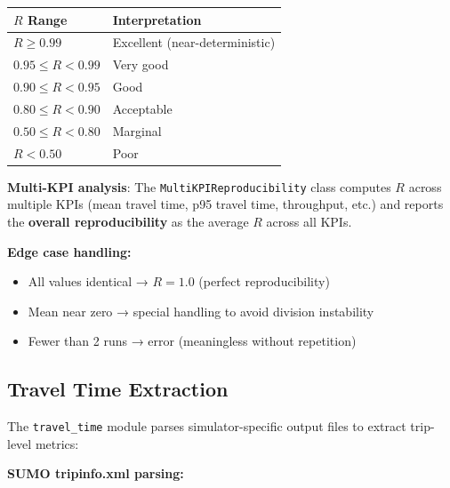 \begin{longtable}[]{@{}ll@{}}
\toprule\noalign{}
\(R\) Range & Interpretation \\
\midrule\noalign{}
\endhead
\bottomrule\noalign{}
\endlastfoot
\(R \geq 0.99\) & Excellent (near-deterministic) \\
\(0.95 \leq R < 0.99\) & Very good \\
\(0.90 \leq R < 0.95\) & Good \\
\(0.80 \leq R < 0.90\) & Acceptable \\
\(0.50 \leq R < 0.80\) & Marginal \\
\(R < 0.50\) & Poor \\
\end{longtable}

\textbf{Multi-KPI analysis}: The \texttt{MultiKPIReproducibility} class
computes \(R\) across multiple KPIs (mean travel time, p95 travel time,
throughput, etc.) and reports the \textbf{overall reproducibility} as
the average \(R\) across all KPIs.

\textbf{Edge case handling:}

\begin{itemize}
\tightlist
\item
  All values identical → \(R = 1.0\) (perfect reproducibility)
\item
  Mean near zero → special handling to avoid division instability
\item
  Fewer than 2 runs → error (meaningless without repetition)
\end{itemize}

\subsection{Travel Time
Extraction}\label{365-travel-time-extraction}

The \texttt{travel\_time} module parses simulator-specific output files
to extract trip-level metrics:

\textbf{SUMO tripinfo.xml parsing:}

\begin{Shaded}
\begin{Highlighting}[]
\NormalTok{\textless{}}
\NormalTok{/\textgreater{}}
\end{Highlighting}
\end{Shaded}

